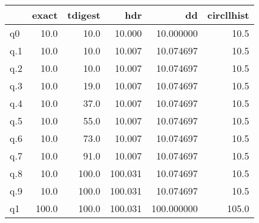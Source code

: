 \begin{tabular}{lrrrrr}
\toprule
{} &  exact &  tdigest &      hdr &          dd &  circllhist \\
\midrule
q0  &   10.0 &     10.0 &   10.000 &   10.000000 &        10.5 \\
q.1 &   10.0 &     10.0 &   10.007 &   10.074697 &        10.5 \\
q.2 &   10.0 &     10.0 &   10.007 &   10.074697 &        10.5 \\
q.3 &   10.0 &     19.0 &   10.007 &   10.074697 &        10.5 \\
q.4 &   10.0 &     37.0 &   10.007 &   10.074697 &        10.5 \\
q.5 &   10.0 &     55.0 &   10.007 &   10.074697 &        10.5 \\
q.6 &   10.0 &     73.0 &   10.007 &   10.074697 &        10.5 \\
q.7 &   10.0 &     91.0 &   10.007 &   10.074697 &        10.5 \\
q.8 &   10.0 &    100.0 &  100.031 &   10.074697 &        10.5 \\
q.9 &   10.0 &    100.0 &  100.031 &   10.074697 &        10.5 \\
q1  &  100.0 &    100.0 &  100.031 &  100.000000 &       105.0 \\
\bottomrule
\end{tabular}
